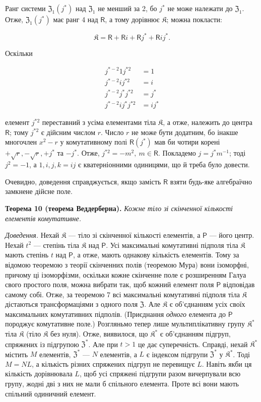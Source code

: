 \documentclass[11pt]{article}
\begin{document}
Ранг системи \(\mathfrak Z_1(j^*)\) над \(\mathfrak Z_1\) не менший за 2, бо \(j^*\) не може належати до \(\mathfrak Z_1\). Отже, \(\mathfrak Z_1(j^*)\) має ранг 4 над \(\mathsf{R}\), а тому дорівнює \(\mathfrak K\); можна покласти:

\[
\mathfrak K=\mathsf R+\mathsf Ri+\mathsf Rj^*+\mathsf Rij^*.
\]

Оскільки

\[
\begin{aligned}
j^{*-2}1j^{*2}&=1\\
j^{*-2}ij^{*2}&=i\\
j^{*-2}j^*j^{*2}&=j^*\\
j^{*-2}ij^*j^{*2}&=ij^*
\end{aligned}
\]

елемент \(j^{*2}\) переставний з усіма елементами тіла \(\mathfrak K\), а отже, належить до центра \(\mathsf{R}\); тому \(j^{*2}\) є дійсним числом \(r\). Число \(r\) не може бути додатним, бо інакше многочлен \(x^2-r\) у комутативному полі \(\mathsf{R}(j^*)\) мав би чотири корені \(+\sqrt r,-\sqrt r,+j^*\) та \(-j^*\). Отже, \(j^{*2}=-m^2,\ m\in \mathsf{R}\). Покладемо \(j=j^*m^{-1}\); тоді \(j^2=-1\), а \(1,i,j,k=ij\) є кватерніонними одиницями, що й треба було довести.

Очевидно, доведення справджується, якщо замість \(\mathsf{R}\) взяти будь-яке алгебраїчно замкнене дійсне поле.

\textbf{Теорема 10 (теорема Веддерберна).} \emph{Кожне тіло зі скінченної кількості елементів комутативне.}

\emph{Доведення.} Нехай \(\mathfrak K\) --- тіло зі скінченної кількості елементів, а \(\mathsf P\) --- його центр. Нехай \(t^2\) --- степінь тіла \(\mathfrak K\) над \(\mathsf P\). Усі максимальні комутативні підполя тіла \(\mathfrak K\) мають степінь \(t\) над \(\mathsf P\), а отже, мають однакову кількість елементів. Тому за відомою теоремою з теорії скінченних полів (теоремою Мура) вони ізоморфні, причому ці ізоморфізми, оскільки кожне скінченне поле є розширенням Галуа свого простого поля, можна вибрати так, щоб кожний елемент поля \(\mathsf P\) відповідав самому собі. Отже, за теоремою 7 всі максимальні комутативні підполя тіла \(\mathfrak K\) дістаються трансформаціями з одного поля \(\mathfrak Z\). Але \(\mathfrak K\) є об'єднанням усіх своїх максимальних комутативних підполів. (Приєднання \emph{одного} елемента до \(\mathsf P\) породжує комутативне поле.) Розгляньмо тепер лише мультиплікативну групу \(\mathfrak K^*\) тіла \(\mathfrak K\) (тіло \(\mathfrak K\) без нуля). Отже, виявилося, що \(\mathfrak K^*\) є об'єднанням підгруп, спряжених із підгрупою \(\mathfrak Z^*\). Але при \(t>1\) це дає суперечність. Справді, нехай \(\mathfrak K^*\) містить \(M\) елементів, \(\mathfrak Z^*\) --- \(N\) елементів, а \(L\) є індексом підгрупи \(\mathfrak Z^*\) у \(\mathfrak K^*\). Тоді \(M=NL\), а кількість різних спряжених підгруп не перевищує \(L\). Навіть якби ця кількість дорівнювала \(L\), щоб усі спряжені підгрупи разом вичерпували всю групу, жодні дві з них не мали б спільного елемента. Проте всі вони мають спільний одиничний елемент.
\end{document}
